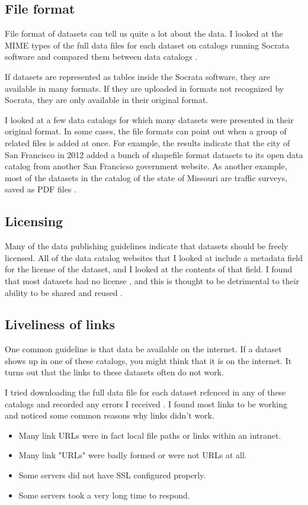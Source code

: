 \documentclass{acm_proc_article-sp}
\begin{document}
\subsection{File format}
File format of datasets can tell us quite a lot about the data. I looked at the
MIME types of the full data files for each dataset on catalogs running Socrata
software and compared them between data catalogs \cite{file-formats}.

If datasets are represented as tables inside the Socrata
software, they are available in many formats. If they are uploaded in formats
not recognized by Socrata, they are only available in their original format.

I looked at a few data catalogs for which many datasets were presented in
their original format. In some cases, the file formats can point out when a
group of related files is added at once. For example, the results indicate
that the city of San Francisco in 2012 added a bunch of shapefile format
datasets to its open data catalog from another San Francicso government
website. As another example, most of the datasets in the catalog of the
state of Missouri are traffic surveys, saved as PDF files \cite{missouri}.

\subsection{Licensing}
Many of the data publishing guidelines indicate that datasets should be freely
licensed. All of the data catalog websites that I looked at include a metadata
field for the license of the dataset, and I looked at the contents of that field.
I found that most datasets had no license \cite{licensing}, and this is thought
to be detrimental to their ability to be shared and reused
\cite{open-data-census,fivestars,sunlight,sebastopol,odi}.

\subsection{Liveliness of links}
One common guideline is that data be available on the internet. If a dataset
shows up in one of these catalogs, you might think that it is on the internet.
It turns out that the links to these datasets often do not work.

I tried downloading the
full data file for each dataset refenced in any of these catalogs and recorded
any errors I received \cite{dead,zombie}. I found most links to be working and
noticed some common reasons why links didn't work.
\begin{itemize}
\item Many link URLs were in fact local file paths or links within an intranet.
\item Many link "URLs" were badly formed or were not URLs at all.
\item Some servers did not have SSL configured properly.
\item Some servers took a very long time to respond.
\end{itemize}
\end{document}
